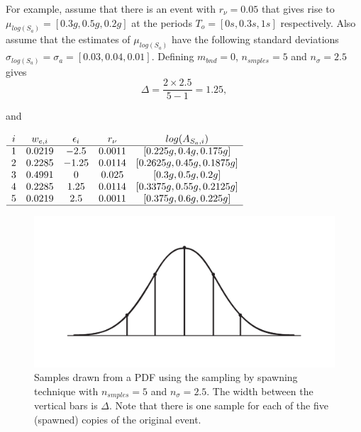 For example, assume that there is an event with $r_\nu=0.05$ that
gives rise to \mbox{$\mu_{log(S_a)}=[0.3g, 0.5g, 0.2g]$} at the
periods \mbox{$T_o = [0s,0.3s,1s]$} respectively. Also assume that
the estimates of $\mu_{log(S_a)}$ have the following standard
deviations \mbox{$\sigma_{log(S_a)}=\sigma_a = [0.03,0.04,0.01]$}.
Defining $m_{bnd}=0$, $n_{smples}=5$ and $n_\sigma=2.5$ gives
\begin{equation}
\Delta = \frac{2 \times 2.5}{5-1} = 1.25,
\end{equation}

and

\begin{center} $ \begin{array}{ccccc}
i & w_{e,i} & \epsilon_i & r_\nu & log(A_{S_a,i}) \\
\hline
1 & 0.0219 & -2.5 & 0.0011 & [0.225g, 0.4g, 0.175g] \\
2 & 0.2285 & -1.25 & 0.0114 & [0.2625g, 0.45g, 0.1875g] \\
3 & 0.4991 & 0 & 0.025 & [0.3g, 0.5g, 0.2g] \\
4 & 0.2285 & 1.25 & 0.0114 & [0.3375g, 0.55g, 0.2125g] \\
5 & 0.0219 & 2.5 & 0.0011 & [0.375g, 0.6g, 0.225g] \\
\hline
\end{array}$
\end{center}

\begin{figure}
\includegraphics[width=1\textwidth]{diags/fig-hattn-spawning}
\caption{Samples drawn from a PDF using the sampling by spawning
technique with $n_{smples}=5$ and $n_\sigma=2.5$. The width between
the vertical bars is $\Delta$. Note that there is one sample for
each of the five (spawned) copies of the original event.}
\label{fig:hattn-spawnsamp}
\end{figure}

